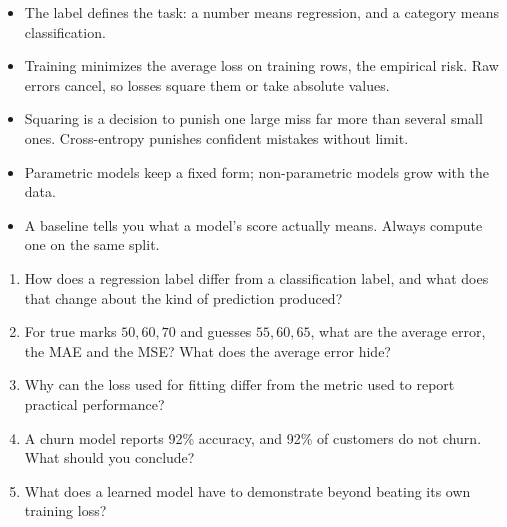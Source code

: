 \begin{chapterrecap}
\begin{itemize}
  \item The label defines the task: a number means regression, and a category means classification.
  \item Training minimizes the average loss on training rows, the empirical risk. Raw errors cancel, so losses square them or take absolute values.
  \item Squaring is a decision to punish one large miss far more than several small ones. Cross-entropy punishes confident mistakes without limit.
  \item Parametric models keep a fixed form; non-parametric models grow with the data.
  \item A baseline tells you what a model's score actually means. Always compute one on the same split.
\end{itemize}
\end{chapterrecap}

\begin{quickcheck}
\begin{enumerate}
  \item How does a regression label differ from a classification label, and what does that change about the kind of prediction produced?
  \item For true marks $50,60,70$ and guesses $55,60,65$, what are the average error, the MAE and the MSE? What does the average error hide?
  \item Why can the loss used for fitting differ from the metric used to report practical performance?
  \item A churn model reports 92\% accuracy, and 92\% of customers do not churn. What should you conclude?
  \item What does a learned model have to demonstrate beyond beating its own training loss?
\end{enumerate}
\end{quickcheck}
